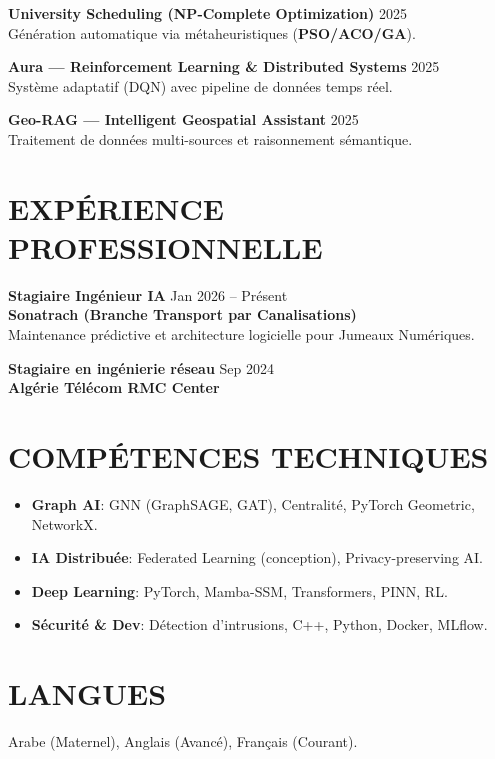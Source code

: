 \documentclass[a4paper,11pt]{article}
\begin{document}
\textbf{University Scheduling (NP-Complete Optimization)} \hfill 2025 \\
Génération automatique via métaheuristiques (\textbf{PSO/ACO/GA}).

\textbf{Aura — Reinforcement Learning \& Distributed Systems} \hfill 2025 \\
Système adaptatif (DQN) avec pipeline de données temps réel.

\textbf{Geo-RAG — Intelligent Geospatial Assistant} \hfill 2025 \\
Traitement de données multi-sources et raisonnement sémantique.

\section{EXPÉRIENCE PROFESSIONNELLE}
\textbf{Stagiaire Ingénieur IA} \hfill Jan 2026 -- Présent \\
\textbf{Sonatrach (Branche Transport par Canalisations)} \\
Maintenance prédictive et architecture logicielle pour Jumeaux Numériques.

\textbf{Stagiaire en ingénierie réseau} \hfill Sep 2024 \\
\textbf{Algérie Télécom RMC Center}

\section{COMPÉTENCES TECHNIQUES}
\begin{itemize}
    \item \textbf{Graph AI}: GNN (GraphSAGE, GAT), Centralité, PyTorch Geometric, NetworkX.
    \item \textbf{IA Distribuée}: Federated Learning (conception), Privacy-preserving AI.
    \item \textbf{Deep Learning}: PyTorch, Mamba-SSM, Transformers, PINN, RL.
    \item \textbf{Sécurité \& Dev}: Détection d'intrusions, C++, Python, Docker, MLflow.
\end{itemize}

\section{LANGUES}
Arabe (Maternel), Anglais (Avancé), Français (Courant).
\end{document}
